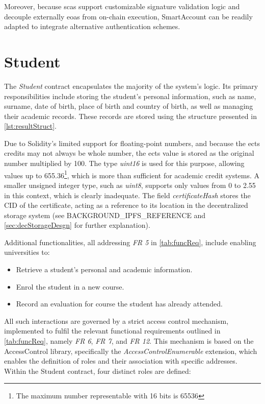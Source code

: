 Moreover, because \acrlong{sca}s support customizable signature validation logic and decouple externally \acrshort{eoa}s from on-chain execution, SmartAccount can be readily adapted to integrate alternative authentication schemes.

\section{Student}
\label{sec:studentContract}
The \textit{Student} contract encapsulates the majority of the system's logic. Its primary responsibilities include storing the student's personal information, such as name, surname, date of birth, place of birth and country of birth, as well as managing their academic records. These records are stored using the structure presented in \cref{lst:resultStruct}. 

Due to Solidity's limited support for floating-point numbers, and because the \acrshort{ects} credits may not always be whole number, the \acrshort{ects} value is stored as the original number multiplied by 100. The type \textit{uint16} is used for this purpose, allowing values up to 655.36\footnote{The maximum number representable with 16 bits is 65536},  which is more than sufficient for academic credit systems. A smaller unsigned integer type, such as \textit{uint8}, supports only values from 0 to 2.55 in this context, which is clearly inadequate. The field \textit{certificateHash} stores the CID of the certificate, acting as a reference to its location in the decentralized storage system (see BACKGROUND\_IPFS\_REFERENCE and \cref{sec:decStorageDesgn} for further explanation). 

Additional functionalities, all addressing \textit{FR 5} in \cref{tab:funcReq}, include enabling universities to:
\begin{itemize}
    \item Retrieve a student's personal and academic information.
    \item Enrol the student in a new course.
    \item Record an evaluation for course the student has already attended.
\end{itemize}
All such interactions are governed by a strict access control mechanism, implemented to fulfil the relevant functional requirements outlined in \cref{tab:funcReq}, namely \textit{FR 6}, \textit{FR 7}, and \textit{FR 12}. This mechanism is based on the AccessControl library, specifically the \textit{AccessControlEnumerable} extension, which enables the definition of roles and their association with specific addresses. Within the Student contract, four distinct roles are defined:

